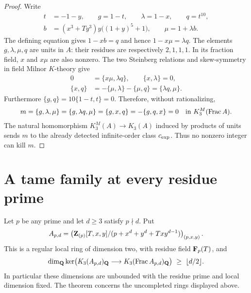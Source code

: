 \begin{proof}
Write
\begin{align*}
 t&=-1-y,\qquad g=1-t,\qquad \lambda=1-x,\qquad q=t^{10},\\
 b&=(x^3+Ty^3)y\bigl((1+y)^5+1\bigr),\qquad \mu=1+\lambda b.
\end{align*}
The defining equation gives $1-xb=q$ and hence
$1-x\mu=\lambda q$. The elements $g,\lambda,\mu,q$
are units in $A$: their residues are respectively $2,1,1,1$.
In its fraction field, $x$ and $x\mu$ are also nonzero.
The two Steinberg relations and skew-symmetry in field
Milnor $K$-theory give
\begin{align*}
 0&=\{x\mu,\lambda q\},\qquad \{x,\lambda\}=0,\\
 \{x,q\}&=-\{\mu,\lambda\}-\{\mu,q\}
            =\{\lambda q,\mu\}.
\end{align*}
Furthermore $\{g,q\}=10\{1-t,t\}=0$. Therefore, without
rationalizing,
\[
 m=\{g,\lambda,\mu\}
   =\{g,\lambda q,\mu\}
   =\{g,x,q\}
   =-\{g,q,x\}=0
       \quad\text{in }K_3^M(\operatorname{Frac} A).
\]
The natural homomorphism $K_3^M(A)\to K_3(A)$ induced
by products of units sends $m$ to the already detected
infinite-order class $c_{\rm exp}$. Thus no nonzero integer
can kill $m$. 
\end{proof}

\section{A tame family at every residue prime}
\label{d2ext:sec-tame-family}

\begin{theorem}
\label{d2ext:twodimtamefamily}
Let $p$ be any prime and let $d\ge3$ satisfy $p\nmid d$. Put
\[
 A_{p,d}=\left(\mathbf Z_{(p)}[T,x,y]/
       (p+x^d+y^d+Txy^{d-1})\right)_{(p,x,y)}.
\]
This is a regular local ring of dimension two, with residue field
$\mathbf F_p(T)$, and
\[
 \dim_{\mathbf Q}\ker\bigl(K_3(A_{p,d})_{\mathbf Q}
       \longrightarrow K_3(\operatorname{Frac} A_{p,d})_{\mathbf Q}\bigr)
       \ \ge\ \lfloor d/2\rfloor.
\]
In particular these dimensions are unbounded with the residue
prime and local dimension fixed. The theorem concerns the
uncompleted rings displayed above.
\end{theorem}

